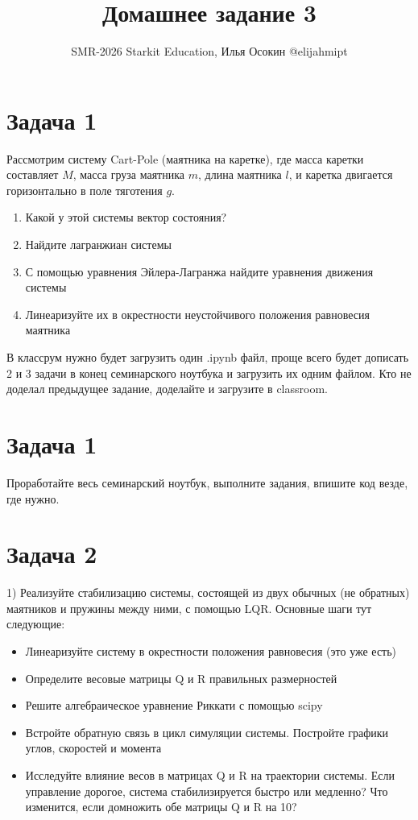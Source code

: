 \documentclass{article}
\begin{document}
\title{Домашнее задание 3}
\date{}
\author{SMR-2026 Starkit Education, Илья Осокин @elijahmipt} %
\maketitle

\section*{Задача 1}

\noindent 

Рассмотрим систему Cart-Pole (маятника на каретке), где масса каретки составляет $M$, масса груза маятника $m$, длина маятника $l$, и каретка двигается горизонтально в поле тяготения $g$.

\begin{enumerate}
    \item Какой у этой системы вектор состояния?
    \item Найдите лагранжиан системы
    \item С помощью уравнения Эйлера-Лагранжа найдите уравнения движения системы
    \item Линеаризуйте их в окрестности неустойчивого положения равновесия маятника
\end{enumerate}

В классрум нужно будет загрузить один .ipynb файл, проще всего будет дописать 2 и 3 задачи в конец семинарского ноутбука и загрузить их одним файлом. Кто не доделал предыдущее задание, доделайте и загрузите в classroom.

\section*{Задача 1}

Проработайте весь семинарский ноутбук, выполните задания, впишите код везде, где нужно.

\section*{Задача 2}

1) Реализуйте стабилизацию системы, состоящей из двух обычных (не обратных) маятников и пружины между ними, с помощью LQR. Основные шаги тут следующие:
\begin{itemize}
    \item Линеаризуйте систему в окрестности положения равновесия (это уже есть)
    \item Определите весовые матрицы Q и R правильных размерностей
    \item Решите алгебраическое уравнение Риккати с помощью scipy
    \item Встройте обратную связь в цикл симуляции системы. Постройте графики углов, скоростей и момента
    \item Исследуйте влияние весов в матрицах Q и R на траектории системы. Если управление дорогое, система стабилизируется быстро или медленно? Что изменится, если домножить обе матрицы Q и R на 10?
\end{itemize}
\end{document}
